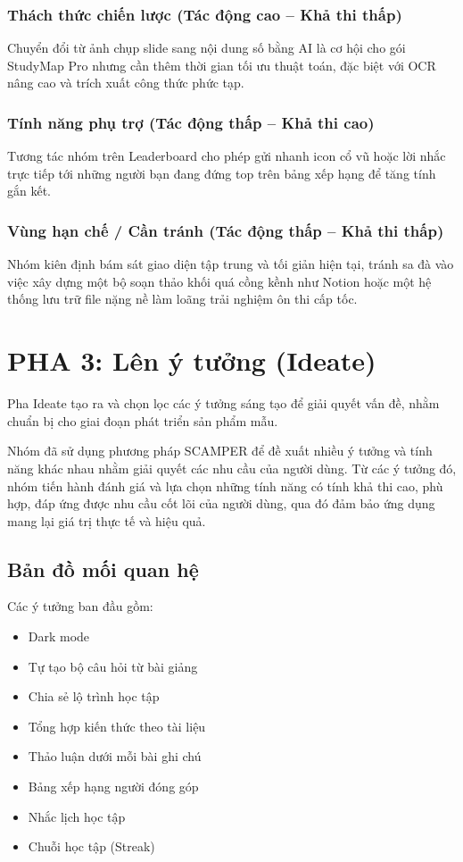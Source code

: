 \documentclass[12pt,a4paper]{report}
\begin{document}
\subsection*{Thách thức chiến lược (Tác động cao -- Khả thi thấp)}
Chuyển đổi từ ảnh chụp slide sang nội dung số bằng AI là cơ hội cho gói StudyMap Pro nhưng cần thêm thời gian tối ưu thuật toán, đặc biệt với OCR nâng cao và trích xuất công thức phức tạp.

\subsection*{Tính năng phụ trợ (Tác động thấp -- Khả thi cao)}
Tương tác nhóm trên Leaderboard cho phép gửi nhanh icon cổ vũ hoặc lời nhắc trực tiếp tới những người bạn đang đứng top trên bảng xếp hạng để tăng tính gắn kết.

\subsection*{Vùng hạn chế / Cần tránh (Tác động thấp -- Khả thi thấp)}
Nhóm kiên định bám sát giao diện tập trung và tối giản hiện tại, tránh sa đà vào việc xây dựng một bộ soạn thảo khối quá cồng kềnh như Notion hoặc một hệ thống lưu trữ file nặng nề làm loãng trải nghiệm ôn thi cấp tốc.

\chapter{PHA 3: Lên ý tưởng (Ideate)}

Pha Ideate tạo ra và chọn lọc các ý tưởng sáng tạo để giải quyết vấn đề, nhằm chuẩn bị cho giai đoạn phát triển sản phẩm mẫu.

Nhóm đã sử dụng phương pháp SCAMPER để đề xuất nhiều ý tưởng và tính năng khác nhau nhằm giải quyết các nhu cầu của người dùng. Từ các ý tưởng đó, nhóm tiến hành đánh giá và lựa chọn những tính năng có tính khả thi cao, phù hợp, đáp ứng được nhu cầu cốt lõi của người dùng, qua đó đảm bảo ứng dụng mang lại giá trị thực tế và hiệu quả.

\section{Bản đồ mối quan hệ}

Các ý tưởng ban đầu gồm:
\begin{itemize}
  \item Dark mode
  \item Tự tạo bộ câu hỏi từ bài giảng
  \item Chia sẻ lộ trình học tập
  \item Tổng hợp kiến thức theo tài liệu
  \item Thảo luận dưới mỗi bài ghi chú
  \item Bảng xếp hạng người đóng góp
  \item Nhắc lịch học tập
  \item Chuỗi học tập (Streak)
\end{itemize}
\end{document}
